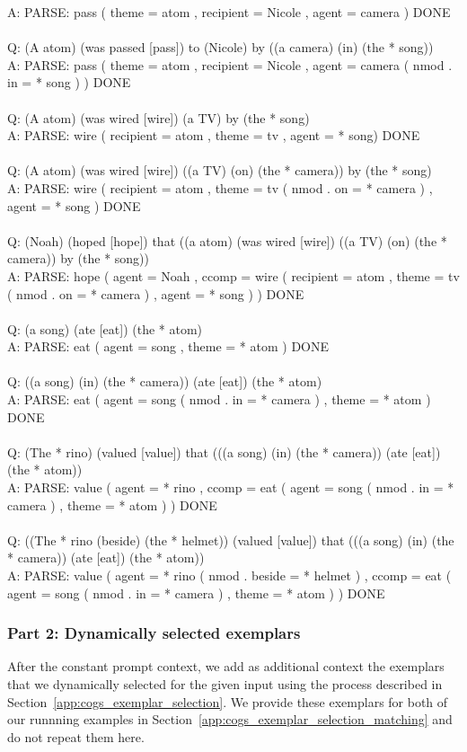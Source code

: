 \documentclass{article} \usepackage{iclr2022_conference,times}
\begin{document}
{A: PARSE: pass ( theme = atom , recipient = Nicole , agent = camera ) DONE \\
 \\
Q: (A atom) (was passed [pass]) to (Nicole) by ((a camera) (in) (the * song)) \\
A: PARSE: pass ( theme = atom , recipient = Nicole , agent = camera ( nmod . in = * song ) ) DONE \\
 \\
Q: (A atom) (was wired [wire]) (a TV) by (the * song) \\
A: PARSE: wire ( recipient = atom , theme = tv , agent = * song) DONE \\
 \\
Q: (A atom) (was wired [wire]) ((a TV) (on) (the * camera)) by (the * song) \\
A: PARSE: wire ( recipient = atom , theme = tv ( nmod . on = * camera ) , agent = * song ) DONE \\
 \\
Q: (Noah) (hoped [hope]) that ((a atom) (was wired [wire]) ((a TV) (on) (the * camera)) by (the * song)) \\
A: PARSE: hope ( agent = Noah , ccomp = wire ( recipient = atom , theme = tv ( nmod . on = * camera ) , agent = * song ) ) DONE \\
 \\
Q: (a song) (ate [eat]) (the * atom) \\
A: PARSE: eat ( agent = song , theme = * atom ) DONE \\
 \\
Q: ((a song) (in) (the * camera)) (ate [eat]) (the * atom) \\
A: PARSE: eat ( agent = song ( nmod . in = * camera ) , theme = * atom ) DONE \\
 \\
Q: (The * rino) (valued [value]) that (((a song) (in) (the * camera)) (ate [eat]) (the * atom)) \\
A: PARSE: value ( agent = * rino , ccomp = eat ( agent = song ( nmod . in = * camera ) , theme = * atom ) ) DONE \\
 \\
Q: ((The * rino (beside) (the * helmet)) (valued [value]) that (((a song) (in) (the * camera)) (ate [eat]) (the * atom)) \\
A: PARSE: value ( agent = * rino ( nmod . beside = * helmet ) , ccomp = eat ( agent = song ( nmod . in = * camera ) , theme = * atom ) ) DONE
}

\subsubsection{Part 2: Dynamically selected exemplars}
After the constant prompt context, we add as additional context the exemplars that we dynamically selected for the given input using the process described in Section~\ref{app:cogs_exemplar_selection}. We provide these exemplars for both of our runnning examples in Section~\ref{app:cogs_exemplar_selection_matching} and do not repeat them here.
\end{document}
